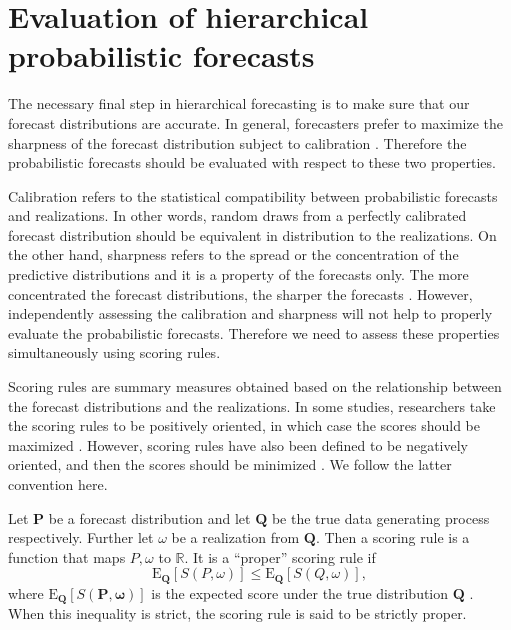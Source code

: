 \documentclass[a4paper, 11pt]{article}
\def\E{\text{E}}
\theoremstyle{theo}
\theoremstyle{definition}
\begin{document}
\section{Evaluation of hierarchical probabilistic forecasts}\label{sec:evaluation}

The necessary final step in hierarchical forecasting is to make sure that our forecast distributions are accurate. In general, forecasters prefer to maximize the sharpness of the forecast distribution subject to calibration \citep{Gneiting2014}. Therefore the probabilistic forecasts should be evaluated with respect to these two properties.

Calibration refers to the statistical compatibility between probabilistic forecasts and realizations. In other words, random draws from a perfectly calibrated forecast distribution should be equivalent in distribution to the realizations. On the other hand, sharpness refers to the spread or the concentration of the predictive distributions and it is a property of the forecasts only. The more concentrated the forecast distributions, the sharper the forecasts \citep{Gneiting2008}. However, independently assessing the calibration and sharpness will not help to properly evaluate the probabilistic forecasts. Therefore we need to assess these properties simultaneously using scoring rules.

Scoring rules are summary measures obtained based on the relationship between the forecast distributions and the realizations. In some studies, researchers take the scoring rules to be positively oriented, in which case the scores should be maximized \citep{Gneiting2007}. However, scoring rules have also been defined to be negatively oriented, and then the scores should be minimized \citep{Gneiting2014}. We follow the latter convention here.

Let $\bm{P}$ be a forecast distribution and let $\bm{Q}$ be the true data generating process respectively. Further let $\omega$ be a realization from $\bm{Q}$. Then a scoring rule is a function that maps $P,\omega$ to $\mathbb{R}$. It is a ``proper'' scoring rule if 
\begin{equation}\label{eq:(3.1.)}
\E_{\bm{Q}}[S(P,\omega)] \le \E_{\bm{Q}}[S(Q,\omega)],
\end{equation}
where $\E_{\bm{Q}}[S(\bm{P,\omega})]$ is the expected score under the true distribution $\bm{Q}$ \citep{Gneiting2008, Gneiting2014}.  When this inequality is strict, the scoring rule is said to be strictly proper.
\end{document}
